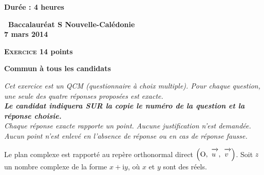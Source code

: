 \documentclass[10pt]{article}
\newcommand{\vect}[1]{\mathchoice%
{\overrightarrow{\displaystyle\mathstrut#1\,\,}}%
{\overrightarrow{\textstyle\mathstrut#1\,\,}}%
{\overrightarrow{\scriptstyle\mathstrut#1\,\,}}%
{\overrightarrow{\scriptscriptstyle\mathstrut#1\,\,}}}
\def\Ouv{$\left(\text{O},~\vect{u},~\vect{v}\right)$}
\begin{document}
\renewcommand \footrulewidth{.2pt}
\pagestyle{fancy}
\thispagestyle{empty}

\begin{center}\textbf{Durée : 4 heures}

\vspace{0,5cm}

{\Large\textbf{\decofourleft~Baccalauréat S  Nouvelle-Calédonie~\decofourright\\7 mars 2014}}
\end{center}

\vspace{0,5cm}

\textbf{\textsc{Exercice 1}\hfill 4 points}

\textbf{Commun à tous les candidats}

\medskip
 
\emph{Cet exercice est un QCM (questionnaire à choix multiple). Pour chaque question, une seule des quatre réponses proposées est exacte.\\ 
\textbf{Le candidat indiquera SUR la copie le numéro de la question et la réponse choisie.}\\ 
Chaque réponse exacte rapporte un point. Aucune justification n'est demandée. Aucun point n'est enlevé en l'absence de réponse ou en cas de réponse fausse.}

\medskip
 
Le plan complexe est rapporté au repère orthonormal direct \Ouv. Soit $z$ un nombre complexe de la forme $x + \text{i}y$, où $x$ et $y$ sont des réels.

\medskip
 
\end{document}
